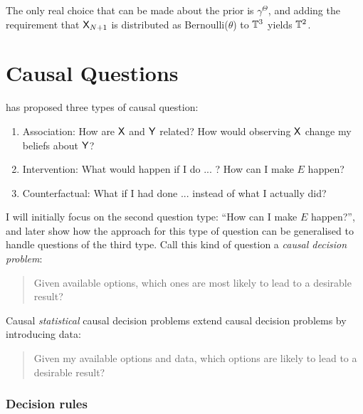 The only real choice that can be made about the prior is $\gamma^\Theta$, and adding the requirement that $\mathsf{X}_{N+1}$ is distributed as Bernoulli($\theta$) to $\mathbb{T}^3$ yields $\mathbb{T}^2$.


\section{Causal Questions}

\citet{pearl_book_2018} has proposed three types of causal question:
\begin{enumerate}
    \item Association: How are $\mathsf{X}$ and $\mathsf{Y}$ related? How would observing $\mathsf{X}$ change my beliefs about $\mathsf{Y}$?
    \item Intervention: What would happen if I do ... ? How can I make $E$ happen?
    \item Counterfactual: What if I had done ... instead of what I actually did?
\end{enumerate}

I will initially focus on the second question type: ``How can I make $E$ happen?'', and later show how the approach for this type of question can be generalised to handle questions of the third type. Call this kind of question a \emph{causal decision problem}:

\begin{quote}\label{def:causal_decision_problem}
    Given available options, which ones are most likely to lead to a desirable result?
\end{quote}

Causal \emph{statistical} causal decision problems extend causal decision problems by introducing data:

\begin{quote}\label{def:causal_statistical_decision_problem}
    Given my available options and data, which options are likely to lead to a desirable result?
\end{quote}


\subsubsection{Decision rules}


